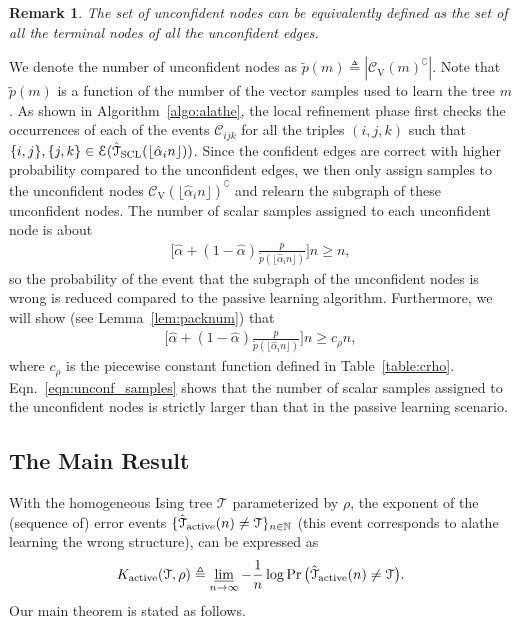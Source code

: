 \documentclass[11pt,onecolumn]{article}
\newcommand{\calC}{\mathcal{C}}
\newcommand{\calE}{\mathcal{E}}
\newcommand{\calT}{\mathcal{T}}
\newcommand{\hatcalT}{\hat{\calT}}
\newcommand{\bbN}{\mathbb{N}}
\newcommand{\scC}{\mathscr{C}}
\newcommand{\tilp}{\tilde{p}}
\newcommand{\halpha}{\hat{\alpha}}
\newtheorem{remark}{Remark}
\newcommand{\Active}{{\rm active}}
\begin{document}
\begin{remark}
    The set of unconfident nodes can be equivalently defined as the set of all the terminal nodes of all the unconfident edges.
\end{remark}
We denote the number of unconfident nodes as $\tilp(m)\triangleq |\scC_{\mathrm{V}}(m)^{\complement}|$. Note that $\tilp(m)$  is a function of the number of the vector samples used to learn the tree  $m$. As shown in Algorithm~\ref{algo:alathe}, the local refinement phase first checks the occurrences of each of the events $\calC_{ijk}$ for all the triples $(i,j,k)$ such that 
$\{i,j\}, \{j,k\}\in \calE(\hatcalT_{\rm{SCL}}(\lfloor\halpha_{i}n\rfloor))$. Since the confident edges are correct with higher probability compared to the unconfident edges, we then only assign samples to the unconfident nodes $\scC_{\mathrm{V}}(\lfloor\halpha_{i}n\rfloor)^{\complement}$ and relearn the 
subgraph of these unconfident nodes. The number of scalar samples assigned to each unconfident node is about
\begin{align}
\bigg[\halpha+(1-\halpha)\frac{p}{\tilp(\lfloor\halpha_{i}n\rfloor)}\bigg]n\geq n,    
\end{align}
 so the probability of the event that the 
subgraph of the unconfident nodes is wrong is reduced compared to the passive learning algorithm. Furthermore, we will show (see Lemma~\ref{lem:packnum}) that 
\begin{align}
\bigg[\halpha+(1-\halpha)\frac{p}{\tilp(\lfloor\halpha_{i}n\rfloor)}\bigg]n\geq c_{\rho}n,   \label{eqn:unconf_samples}  
\end{align}
 where $c_{\rho}$ is the  piecewise constant  function  defined in Table~\ref{table:crho}. Eqn.~\eqref{eqn:unconf_samples} shows that the number of scalar samples assigned to the unconfident nodes is strictly  larger than that in the passive learning scenario.

\subsection{The Main Result} \label{sec:main_res}
With the homogeneous Ising tree $\calT$ parameterized by $\rho$, the exponent of the (sequence of) error events $\{\hatcalT_{\Active}(n)\neq \calT\}_{n\in\bbN}$ (this event corresponds to  \ac{alathe}  learning the wrong structure), can be expressed as
\begin{align}\label{eq:activeee}
	K _{\Active}(\calT,\rho)\triangleq \varliminf_{n\rightarrow \infty}-\frac{1}{n}\log \Pr\big(\hatcalT_{\Active}(n)\neq \calT\big).
\end{align}
Our main theorem is stated as follows.
\end{document}
